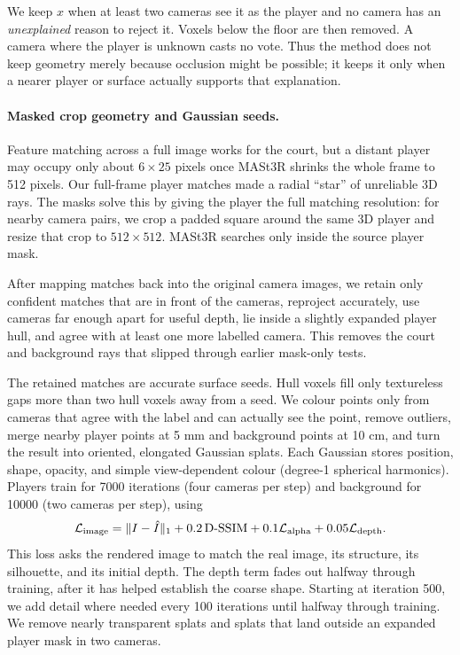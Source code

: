 \documentclass[11pt]{article}
\begin{document}
We keep $x$ when at least two cameras see it as the player and no camera has an \emph{unexplained}
reason to reject it. Voxels below the floor are then removed. A camera where the player is unknown
casts no vote. Thus the method does not keep geometry merely because occlusion might be possible;
it keeps it only when a nearer player or surface actually supports that explanation.

\paragraph{Masked crop geometry and Gaussian seeds.}
Feature matching across a full image works for the court, but a distant player may occupy only
about $6\times25$ pixels once MASt3R shrinks the whole frame to 512 pixels. Our full-frame player
matches made a radial ``star'' of unreliable 3D rays. The masks solve this by giving the player
the full matching resolution: for nearby camera pairs, we crop a padded square around the same 3D
player and resize that crop to $512\times512$. MASt3R searches only inside the source player mask.

After mapping matches back into the original camera images, we retain only confident matches that
are in front of the cameras, reproject accurately, use cameras far enough apart for useful depth,
lie inside a slightly expanded player hull, and agree with at least one more labelled camera. This
removes the court and background rays that slipped through earlier mask-only tests.

The retained matches are accurate surface seeds. Hull voxels fill only textureless gaps more than
two hull voxels away from a seed. We colour points only from cameras that agree with the label and
can actually see the point, remove outliers, merge nearby player points at 5 mm and background
points at 10 cm, and turn the result into oriented, elongated Gaussian splats. Each Gaussian stores
position, shape, opacity, and simple view-dependent colour (degree-1 spherical harmonics).
Players train for 7000 iterations (four cameras per step) and background for 10000 (two cameras
per step), using
\[
\mathcal L_{\rm image}=\|I-\hat I\|_1+0.2\,\mathrm{D\mbox{-}SSIM}
+0.1\mathcal L_{\rm alpha}+0.05\mathcal L_{\rm depth}.
\]
This loss asks the rendered image to match the real image, its structure, its silhouette, and its
initial depth. The depth term fades out halfway through training, after it has helped establish the
coarse shape. Starting at iteration 500, we add detail where needed every 100 iterations until
halfway through training. We remove nearly transparent splats and splats that land outside an
expanded player mask in two cameras.
\end{document}
